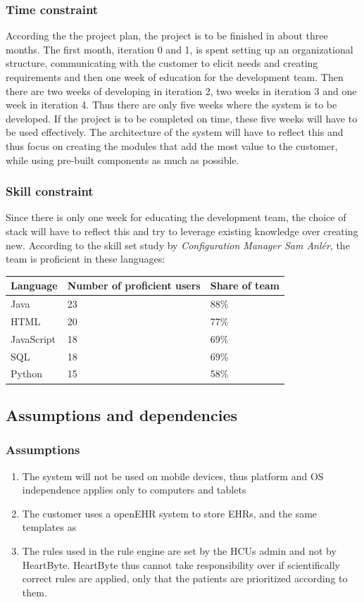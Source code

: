 \documentclass{article}
\begin{document}
\subsubsection{Time constraint}
According the the project plan, the project is to be finished in about three months. The first month, iteration 0 and 1, is spent setting up an organizational structure, communicating with the customer to elicit needs and creating requirements and then one week of education for the development team. Then there are two weeks of developing in iteration 2, two weeks in iteration 3 and one week in iteration 4. 
Thus there are only five weeks where the system is to be developed. If the project is to be completed on time, these five weeks will have to be used effectively. The architecture of the system will have to reflect this and thus focus on creating the modules that add the most value to the customer, while using pre-built components as much as possible.

\subsubsection{Skill constraint}
Since there is only one week for educating the development team, the choice of stack will have to reflect this and try to leverage existing knowledge over creating new. According to the skill set study by \emph{Configuration Manager Sam Anlér}, the team is proficient in these languages:

\begin{table}[h]
\centering
\begin{tabular}{|l|l|l|}
\hline
Language & Number of proficient users & Share of team \\ \hline
Java & 23 & 88\% \\
HTML & 20 & 77\% \\ 
JavaScript & 18 & 69\% \\ 
SQL & 18 & 69\% \\ 
Python & 15 & 58\% \\ 
\hline
\end{tabular}
\end{table}



\subsection{Assumptions and dependencies}
\subsubsection{Assumptions}
\begin{enumerate}[label=(\roman*)]
\item The system will not be used on mobile devices, thus platform and OS independence applies only to computers and tablets 
\item The customer uses a openEHR system to store EHRs, and the same templates as 
\item The rules used in the rule engine are set by the HCUs admin and not by HeartByte. HeartByte thus cannot take responsibility over if scientifically correct rules are applied, only that the patients are prioritized according to them.
\end{enumerate}
\end{document}
